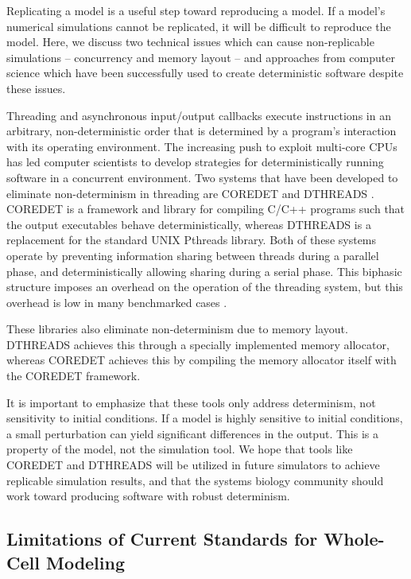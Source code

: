 \documentclass[journal,transmag,twoside]{IEEEtran}
\begin{document}
Replicating a model is a useful step toward reproducing a model.
If a model's numerical simulations cannot be replicated, it will be
difficult to reproduce the model. Here, we discuss two technical issues which can 
cause non-replicable simulations -- concurrency and memory layout -- 
and approaches from computer science which have been successfully used to create 
deterministic software despite these issues.

Threading and asynchronous input/output callbacks execute instructions in an arbitrary,
non-deterministic order that is determined by a program's interaction with 
its operating environment. The increasing push to exploit multi-core CPUs has
led computer scientists to develop strategies for deterministically running software 
in a concurrent environment. Two systems that have been developed to eliminate non-determinism in threading
are C{\small ORE}D{\small ET} \cite{bergan2010coredet} and D{\small THREADS} \cite{liu2011dthreads}.
C{\small ORE}D{\small ET} is a framework and library for compiling C/C++ programs
such that the output executables behave deterministically, whereas
D{\small THREADS} is a replacement for the standard UNIX Pthreads library.
Both of these systems operate by preventing information sharing between
threads during a parallel phase, and deterministically allowing sharing
during a serial phase.
This biphasic structure imposes an overhead on the operation of the threading
system, but this overhead is low in many benchmarked cases \cite{liu2011dthreads}. 

These libraries also eliminate non-determinism
due to memory layout. D{\small THREADS} achieves this through a specially implemented memory allocator,
whereas C{\small ORE}D{\small ET} achieves this by compiling the
memory allocator itself with the C{\small ORE}D{\small ET} framework.

It is important to emphasize that these tools only address determinism, not sensitivity to initial conditions.
If a model is highly sensitive to initial conditions, a small perturbation can yield significant differences in the output. This is a property of the model, not the simulation tool.
We hope that tools like C{\small ORE}D{\small ET} and D{\small THREADS} will be utilized in future simulators
to achieve replicable simulation results, and that the systems biology community should
work toward producing software with robust determinism.

\subsection{Limitations of Current Standards for Whole-Cell Modeling}
\end{document}
